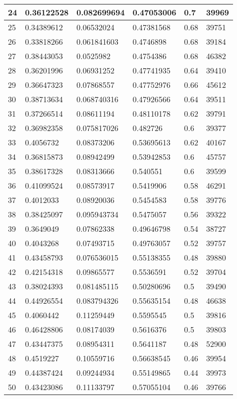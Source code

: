 \begin{longtable}{|l|l|l|l|l|l|}
24 & 0.36122528 & 0.082699694 & 0.47053006 & 0.7 & 39969 \\ \hline 
25 & 0.34389612 & 0.06532024 & 0.47381568 & 0.68 & 39751 \\ \hline 
26 & 0.33818266 & 0.061841603 & 0.4746898 & 0.68 & 39184 \\ \hline 
27 & 0.38443053 & 0.0525982 & 0.4754386 & 0.68 & 46382 \\ \hline 
28 & 0.36201996 & 0.06931252 & 0.47741935 & 0.64 & 39410 \\ \hline 
29 & 0.36647323 & 0.07868557 & 0.47752976 & 0.66 & 45612 \\ \hline 
30 & 0.38713634 & 0.068740316 & 0.47926566 & 0.64 & 39511 \\ \hline 
31 & 0.37266514 & 0.08611194 & 0.48110178 & 0.62 & 39791 \\ \hline 
32 & 0.36982358 & 0.075817026 & 0.482726 & 0.6 & 39377 \\ \hline 
33 & 0.4056732 & 0.08373206 & 0.53695613 & 0.62 & 40167 \\ \hline 
34 & 0.36815873 & 0.08942499 & 0.53942853 & 0.6 & 45757 \\ \hline 
35 & 0.38617328 & 0.08313666 & 0.540551 & 0.6 & 39599 \\ \hline 
36 & 0.41099524 & 0.08573917 & 0.5419906 & 0.58 & 46291 \\ \hline 
37 & 0.4012033 & 0.08920036 & 0.5454583 & 0.58 & 39776 \\ \hline 
38 & 0.38425097 & 0.095943734 & 0.5475057 & 0.56 & 39322 \\ \hline 
39 & 0.3649049 & 0.07862338 & 0.49646798 & 0.54 & 38727 \\ \hline 
40 & 0.4043268 & 0.07493715 & 0.49763057 & 0.52 & 39757 \\ \hline 
41 & 0.43458793 & 0.076536015 & 0.55138355 & 0.48 & 39880 \\ \hline 
42 & 0.42154318 & 0.09865577 & 0.5536591 & 0.52 & 39704 \\ \hline 
43 & 0.38024393 & 0.081485115 & 0.50280696 & 0.5 & 39490 \\ \hline 
44 & 0.44926554 & 0.083794326 & 0.55635154 & 0.48 & 46638 \\ \hline 
45 & 0.4060442 & 0.11259449 & 0.5595545 & 0.5 & 39816 \\ \hline 
46 & 0.46428806 & 0.08174039 & 0.5616376 & 0.5 & 39803 \\ \hline 
47 & 0.43447375 & 0.08954311 & 0.5641187 & 0.48 & 52900 \\ \hline 
48 & 0.4519227 & 0.10559716 & 0.56638545 & 0.46 & 39954 \\ \hline 
49 & 0.44387424 & 0.09244934 & 0.55149865 & 0.44 & 39973 \\ \hline 
50 & 0.43423086 & 0.11133797 & 0.57055104 & 0.46 & 39766 \\ \hline 
\end{longtable}